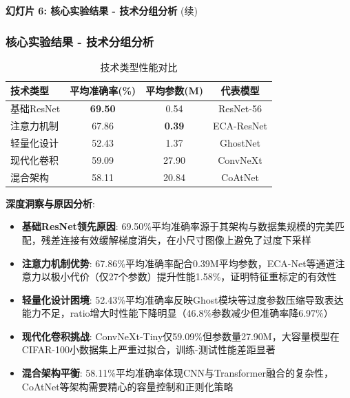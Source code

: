 \documentclass[10pt]{beamer}
\begin{document}
\begin{frame}{\textbf{幻灯片 6: 核心实验结果 - 技术分组分析} (续)}
\frametitle{核心实验结果 - 技术分组分析}

\vspace{-2em}
\hspace{-0.8cm}
\begin{center}
\begin{table}[h]
\small
\begin{tabular}{|l|c|c|c|}
\hline
技术类型 & 平均准确率(\%) & 平均参数(M) & 代表模型 \\
\hline
基础ResNet & \textbf{69.50} & 0.54 & ResNet-56 \\
注意力机制 & 67.86 & \textbf{0.39} & ECA-ResNet \\
轻量化设计 & 52.43 & 1.37 & GhostNet \\
现代化卷积 & 59.09 & 27.90 & ConvNeXt \\
混合架构 & 58.11 & 20.84 & CoAtNet \\
\hline
\end{tabular}
\caption{技术类型性能对比}
\end{table}
\end{center}

\vspace{-1em}
{\scriptsize \textbf{深度洞察与原因分析}:
\begin{itemize}
    \item \textbf{基础ResNet领先原因}: 69.50\%平均准确率源于其架构与数据集规模的完美匹配，残差连接有效缓解梯度消失，在小尺寸图像上避免了过度下采样
    \item \textbf{注意力机制优势}: 67.86\%平均准确率配合0.39M平均参数，ECA-Net等通道注意力以极小代价（仅27个参数）提升性能1.58\%，证明特征重标定的有效性
    \item \textbf{轻量化设计困境}: 52.43\%平均准确率反映Ghost模块等过度参数压缩导致表达能力不足，ratio增大时性能下降明显（46.8\%参数减少但准确率降6.97\%）
    \item \textbf{现代化卷积挑战}: ConvNeXt-Tiny仅59.09\%但参数量27.90M，大容量模型在CIFAR-100小数据集上严重过拟合，训练-测试性能差距显著
    \item \textbf{混合架构平衡}: 58.11\%平均准确率体现CNN与Transformer融合的复杂性，CoAtNet等架构需要精心的容量控制和正则化策略
\end{itemize}}

\end{frame}
\end{document}

